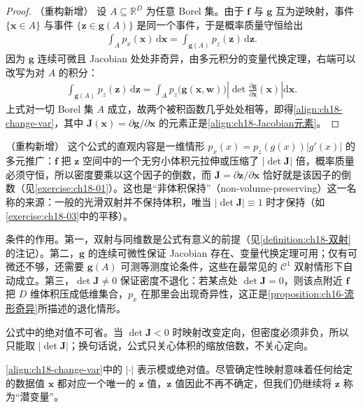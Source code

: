 \documentclass[../main.tex]{subfiles}
\begin{document}
\begin{proof}（重构新增）
设 $A\subseteq\mathbb{R}^{D}$ 为任意 Borel 集。由于 $\bm{f}$ 与 $\bm{g}$ 互为逆映射，事件 $\{\bm{x}\in A\}$ 与事件 $\{\bm{z}\in\bm{g}(A)\}$ 是同一个事件，于是概率质量守恒给出
\begin{align*}
  \int_{A}p_x(\bm{x})\,\mathrm{d}\bm{x}=\int_{\bm{g}(A)}p_z(\bm{z})\,\mathrm{d}\bm{z}.
\end{align*}
因为 $\bm{g}$ 连续可微且 Jacobian 处处非奇异，由多元积分的变量代换定理，右端可以改写为对 $A$ 的积分：
\begin{align*}
  \int_{\bm{g}(A)}p_z(\bm{z})\,\mathrm{d}\bm{z}=\int_{A}p_z\big(\bm{g}(\bm{x},\bm{w})\big)\left|\det\frac{\partial\bm{g}}{\partial\bm{x}}(\bm{x})\right|\mathrm{d}\bm{x}.
\end{align*}
上式对一切 Borel 集 $A$ 成立，故两个被积函数几乎处处相等，即得\eqref{align:ch18-change-var}，其中 $\bm{J}(\bm{x})=\partial\bm{g}/\partial\bm{x}$ 的元素正是\eqref{align:ch18-Jacobian元素}。
\end{proof}

\begin{remark}（重构新增）
这个公式的直观内容是一维情形 $p_x(x)=p_z(g(x))|g'(x)|$ 的多元推广：$\bm{f}$ 把 $\bm{z}$ 空间中的一个无穷小体积元拉伸或压缩了 $|\det\bm{J}|$ 倍，概率质量必须守恒，所以密度要乘以这个因子的倒数，而 $\bm{J}=\partial\bm{z}/\partial\bm{x}$ 恰好就是该因子的倒数（见\cref{exercise:ch18-01}）。这也是“非体积保持”（non-volume-preserving）这一名称的来源：一般的光滑双射并不保持体积，唯当 $|\det\bm{J}|\equiv1$ 时才保持（如\cref{exercise:ch18-03}中的平移）。

条件的作用。第一，双射与同维数是公式有意义的前提（见\cref{definition:ch18-双射}的注记）。第二，$\bm{g}$ 的连续可微性保证 Jacobian 存在、变量代换定理可用；仅有可微还不够，还需要 $\bm{g}(A)$ 可测等测度论条件，这些在最常见的 $\mathcal{C}^{1}$ 双射情形下自动成立。第三，$\det\bm{J}\neq0$ 保证密度不退化：若某点处 $\det\bm{J}=0$，则该点附近 $\bm{f}$ 把 $D$ 维体积压成低维集合，$p_x$ 在那里会出现奇异性，这正是\cref{proposition:ch16-流形奇异}所描述的退化情形。

公式中的绝对值不可省。当 $\det\bm{J}<0$ 时映射改变定向，但密度必须非负，所以只能取 $|\det\bm{J}|$；换句话说，公式只关心体积的缩放倍数，不关心定向。
\end{remark}

\eqref{align:ch18-change-var}中的 $|\cdot|$ 表示模或绝对值。尽管确定性映射意味着任何给定的数据值 $\bm{x}$ 都对应一个唯一的 $\bm{z}$ 值，$\bm{z}$ 值因此不再不确定，但我们仍继续将 $\bm{z}$ 称为“潜变量”。
\end{document}
